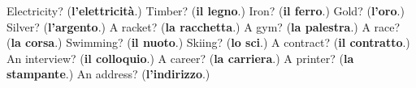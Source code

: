 \begin{tcolorbox}[breakable,colback=teal!4,colframe=teal!35!black,title={Before you move on}]
Electricity? (\textbf{l'elettricità}.) Timber? (\textbf{il legno}.) Iron? (\textbf{il ferro}.) Gold? (\textbf{l'oro}.) Silver? (\textbf{l'argento}.) A racket? (\textbf{la racchetta}.) A gym? (\textbf{la palestra}.) A race? (\textbf{la corsa}.) Swimming? (\textbf{il nuoto}.) Skiing? (\textbf{lo sci}.) A contract? (\textbf{il contratto}.) An interview? (\textbf{il colloquio}.) A career? (\textbf{la carriera}.) A printer? (\textbf{la stampante}.) An address? (\textbf{l'indirizzo}.)
\end{tcolorbox}
